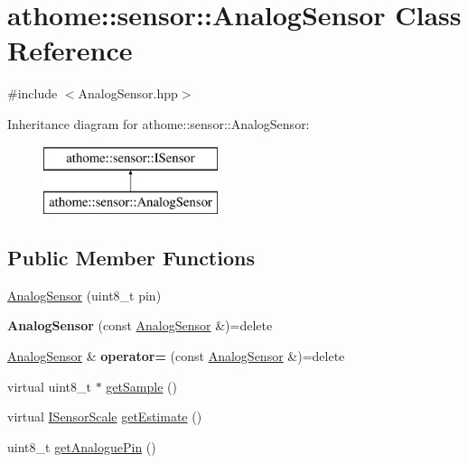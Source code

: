 \hypertarget{classathome_1_1sensor_1_1_analog_sensor}{}\section{athome\+:\+:sensor\+:\+:Analog\+Sensor Class Reference}
\label{classathome_1_1sensor_1_1_analog_sensor}


{\ttfamily \#include $<$Analog\+Sensor.\+hpp$>$}

Inheritance diagram for athome\+:\+:sensor\+:\+:Analog\+Sensor\+:\begin{figure}[H]
\begin{center}
\leavevmode
\includegraphics[height=2.000000cm]{classathome_1_1sensor_1_1_analog_sensor}
\end{center}
\end{figure}
\subsection*{Public Member Functions}
\begin{DoxyCompactItemize}
\item 
\mbox{\hyperlink{classathome_1_1sensor_1_1_analog_sensor_acd973b3cf9be02ca318eea594e8732d3}{Analog\+Sensor}} (uint8\+\_\+t pin)
\item 
\mbox{\label{classathome_1_1sensor_1_1_analog_sensor_a11abebcdb62ccd8fb7f10e4d1cc91516}} 
{\bfseries Analog\+Sensor} (const \mbox{\hyperlink{classathome_1_1sensor_1_1_analog_sensor}{Analog\+Sensor}} \&)=delete
\item 
\mbox{\label{classathome_1_1sensor_1_1_analog_sensor_a3e2cb67bd8eb58798d28eaf152f33b1a}} 
\mbox{\hyperlink{classathome_1_1sensor_1_1_analog_sensor}{Analog\+Sensor}} \& {\bfseries operator=} (const \mbox{\hyperlink{classathome_1_1sensor_1_1_analog_sensor}{Analog\+Sensor}} \&)=delete
\item 
virtual uint8\+\_\+t $\ast$ \mbox{\hyperlink{classathome_1_1sensor_1_1_analog_sensor_ac45070688a9433256a5f847467c251fa}{get\+Sample}} ()
\item 
virtual \mbox{\hyperlink{classathome_1_1sensor_1_1_i_sensor_aa70bc27a4c17c86caf96cca776541ddf}{I\+Sensor\+Scale}} \mbox{\hyperlink{classathome_1_1sensor_1_1_analog_sensor_a728e2f65638f488cd1829c5f318531db}{get\+Estimate}} ()
\item 
uint8\+\_\+t \mbox{\hyperlink{classathome_1_1sensor_1_1_analog_sensor_ac4eab6ad6117e8e6689f9e1d9fb05015}{get\+Analogue\+Pin}} ()
\end{DoxyCompactItemize}

